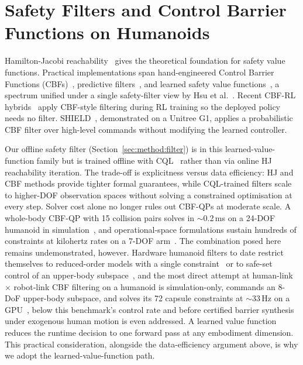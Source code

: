 \documentclass[11pt,a4paper]{report}
\begin{document}
\section{Safety Filters and Control Barrier Functions on Humanoids}
\label{sec:bg:cbf}

Hamilton-Jacobi reachability~\cite{bansal2017hamilton,ganai2024hjsurvey}
gives the theoretical foundation for safety value functions.
Practical implementations span hand-engineered Control Barrier
Functions (CBFs)~\cite{ames2019cbf}, predictive
filters~\cite{wabersich2023datadriven}, and learned safety value
functions~\cite{srinivasan2020learning,thananjeyan2021recovery}, a
spectrum unified under a single safety-filter view by Hsu et
al.~\cite{hsu2024safetyfilter}.
Recent CBF-RL hybrids~\cite{cbfrl2024} apply CBF-style filtering
during RL training so the deployed policy needs no filter.
SHIELD~\cite{shield2025}, demonstrated on a Unitree G1, applies a
probabilistic CBF filter over high-level commands without modifying
the learned controller.

Our offline safety filter (Section~\ref{sec:method:filter}) is in
this learned-value-function family but is trained offline with
\textsc{CQL}~\cite{kumar2020cql} rather than via online HJ
reachability iteration. The trade-off is explicitness versus
data efficiency: HJ and CBF methods provide tighter formal
guarantees, while \textsc{CQL}-trained filters scale to higher-DOF
observation spaces without solving a constrained optimisation at
every step. Solver cost alone no longer rules out CBF-QPs at
moderate scale. A whole-body CBF-QP with 15 collision pairs solves
in $\sim$0.2\,ms on a 24-DOF humanoid in
simulation~\cite{khazoom2022selfcollision}, and operational-space
formulations sustain hundreds of constraints at kilohertz rates on a
7-DOF arm~\cite{morton2025oscbf}. The combination posed here remains
undemonstrated, however. Hardware humanoid filters to date restrict
themselves to reduced-order models with a single
constraint~\cite{bena2025poisson,shield2025} or to safe-set control
of an upper-body subspace~\cite{sun2025spark}, and the most direct
attempt at human-link $\times$ robot-link CBF filtering on a
humanoid is simulation-only, commands an 8-DoF upper-body subspace,
and solves its 72 capsule constraints at $\sim$33\,Hz on a
GPU~\cite{cai2026humanoidcbf}, below this benchmark's control rate
and before certified barrier synthesis under exogenous human motion
is even addressed. A learned value function reduces the runtime
decision to one forward pass at any embodiment dimension. This
practical consideration, alongside the data-efficiency argument
above, is why we adopt the learned-value-function path.
\end{document}
